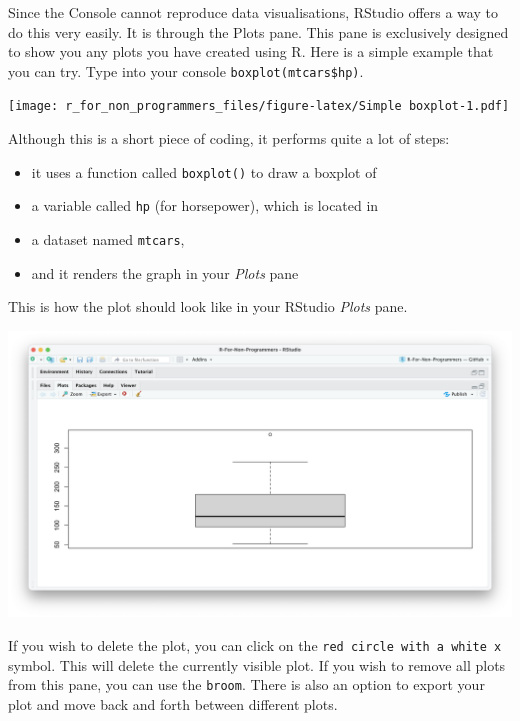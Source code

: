 \documentclass[
]{book}
\newenvironment{Shaded}{\begin{snugshade}}{\end{snugshade}}
\newcommand{\CommentTok}[1]{\textcolor[rgb]{0.56,0.35,0.01}{\textit{#1}}}
\newcommand{\FunctionTok}[1]{\textcolor[rgb]{0.00,0.00,0.00}{#1}}
\newcommand{\NormalTok}[1]{#1}
\newcommand{\SpecialCharTok}[1]{\textcolor[rgb]{0.00,0.00,0.00}{#1}}
\begin{document}
Since the Console cannot reproduce data visualisations, RStudio offers a way to do this very easily. It is through the Plots pane. This pane is exclusively designed to show you any plots you have created using R. Here is a simple example that you can try. Type into your console \texttt{boxplot(mtcars\$hp)}.

\begin{Shaded}
\end{Shaded}

\texttt{[image: r\_for\_non\_programmers\_files/figure-latex/Simple boxplot-1.pdf]}

Although this is a short piece of coding, it performs quite a lot of steps:

\begin{itemize}
\item
  it uses a function called \texttt{boxplot()} to draw a boxplot of
\item
  a variable called \texttt{hp} (for horsepower), which is located in
\item
  a dataset named \texttt{mtcars},
\item
  and it renders the graph in your \emph{Plots} pane
\end{itemize}

This is how the plot should look like in your RStudio \emph{Plots} pane.

\includegraphics{images/chapter_04_img/05_files_plots_etc/02_rstudio_plots.png}

If you wish to delete the plot, you can click on the \texttt{red\ circle\ with\ a\ white\ x} symbol. This will delete the currently visible plot. If you wish to remove all plots from this pane, you can use the \texttt{broom}. There is also an option to export your plot and move back and forth between different plots.
\end{document}

